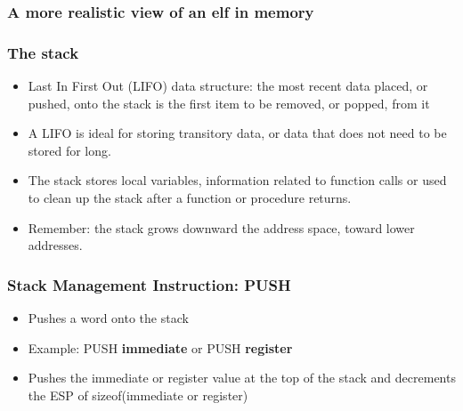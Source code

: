 \documentclass[]{beamer}
\begin{document}
\begin{frame}
  \frametitle{A more realistic view of an elf in memory}
  \begin{figure}
  \end{figure}
\end{frame}
\begin{frame}
  \frametitle{The stack}
  \begin{itemize}
  \item{Last In First Out (LIFO) data structure: the most recent data placed, or pushed, onto the stack is the first item to be removed, or popped, from it}
  \item{A LIFO is ideal for storing transitory data, or data that does not need to be stored for long.}
  \item{The stack stores local variables, information related to function calls or used to clean up the stack after a function or procedure returns.}
  \item{Remember: the stack grows downward the address space, toward lower addresses.}
  \end{itemize}
\end{frame}
\begin{frame}
  \frametitle{Stack Management Instruction: PUSH}
  \begin{itemize}
  \item{Pushes a word onto the stack}
  \item{Example: PUSH {\bf immediate} or PUSH {\bf register} }
  \item{Pushes the immediate or register value at the top of the stack and decrements the ESP of sizeof(immediate or register)}
  \end{itemize}
\end{frame}
\end{document}
